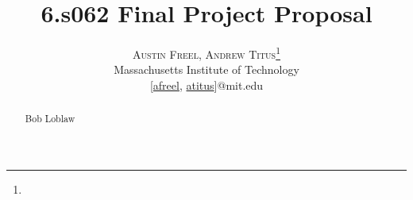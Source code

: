 \documentclass[twoside]{article}
\title{\vspace{-15mm}\fontsize{24pt}{10pt}\selectfont\textbf{6.s062 Final Project Proposal}}
\author{
\large
\textsc{Austin Freel, Andrew Titus}\thanks{}\\[2mm] %
\normalsize Massachusetts Institute of Technology \\ %
\normalsize [\href{mailto:afreel@mit.edu}{afreel}, \href{mailto:atitus@mit.edu}{atitus}]@mit.edu %
\vspace{-5mm}
}
\date{}
\begin{document}
\maketitle %

\thispagestyle{fancy} %


\begin{abstract}

\begin{noindent}
Bob Loblaw
\end{noindent}

\end{abstract}

\end{document}
